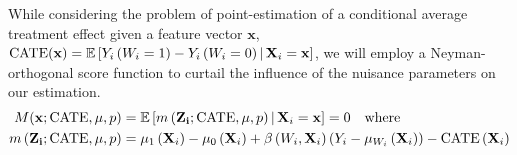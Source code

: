While considering the problem of point-estimation of a conditional average treatment effect given a feature vector $\mathbf{x}$, $\operatorname{CATE}(\mathbf{x}) = \mathbb{E}\left[Y_{i}\left(W_i = 1\right) - Y_{i}\left(W_i = 0\right) \, \middle| \, \mathbf{X}_i = \mathbf{x}\right]$, we will employ a Neyman-orthogonal score function to curtail the influence of the nuisance parameters on our estimation.
\begin{equation}
	\begin{aligned}
		M(\mathbf{x}; \operatorname{CATE}, \mu, p) 
		& = \mathbb{E}\left[m\left(\mathbf{Z_i}; \operatorname{CATE}, \mu, p\right) \, \middle| \, \mathbf{X}_i = \mathbf{x}\right]
		= 0
		\quad \text{where} \quad \\
		m\left(\mathbf{Z_i}; \operatorname{CATE}, \mu, p\right) 
		& = \mu_1\left(\mathbf{X}_i\right) - \mu_0\left(\mathbf{X}_i\right) + \beta\left(W_i, \mathbf{X}_i\right)\left(Y_i - \mu_{W_i}\left(\mathbf{X}_i\right)\right) - \operatorname{CATE}\left(\mathbf{X}_i\right)
	\end{aligned}
\end{equation}

